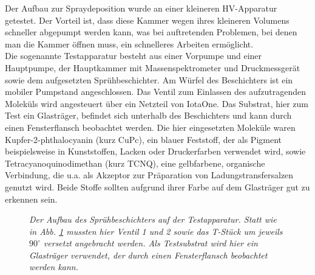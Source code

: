 Der Aufbau zur Spraydeposition wurde an einer kleineren HV-Apparatur getestet. %
Der
Vorteil ist, dass diese Kammer wegen ihres kleineren Volumens schneller abgepumpt werden kann, was bei
auftretenden Problemen, bei denen man die Kammer öffnen muss, ein schnelleres Arbeiten ermöglicht.\\
Die sogenannte Testapparatur besteht aus einer Vorpumpe und  einer Hauptpumpe,
der Hauptkammer mit Massenspektrometer und Druckmessgerät sowie dem aufgesetzten
Sprühbeschichter. Am Würfel des Beschichters ist ein mobiler Pumpstand angeschlossen. Das Ventil
zum Einlassen des aufzutragenden Moleküls wird angesteuert über ein Netzteil von IotaOne. Das
Substrat, hier zum Test ein Glasträger, befindet sich unterhalb des Beschichters und kann durch einen
Fensterflansch beobachtet werden. Die hier eingesetzten Moleküle waren Kupfer-2-phthalocyanin (kurz
CuPc), ein blauer Feststoff, der als Pigment
beispielsweise in Kunststoffen, Lacken oder
Druckerfarben verwendet wird, sowie 
Tetracyanoquinodimethan (kurz TCNQ), eine gelbfarbene,
organische Verbindung, die u.a. als Akzeptor zur Präparation von Ladungstransfersalzen genutzt wird.
Beide Stoffe sollten aufgrund ihrer Farbe auf dem Glasträger gut zu erkennen sein.

 
\begin{figure}[H]
	\centering
	\sffamily
	
	\caption{\textit{Der Aufbau des Sprühbeschichters auf der Testapparatur. Statt wie in Abb.
	\ref{aufbau} mussten hier Ventil 1 und 2 sowie das T-Stück um jeweils $90^{\circ}$ versetzt
	angebracht werden. Als Testsubstrat wird hier ein Glasträger verwendet, der durch einen
	Fensterflansch beobachtet werden kann. }}
\label{aufbau}
\end{figure}
 
 

